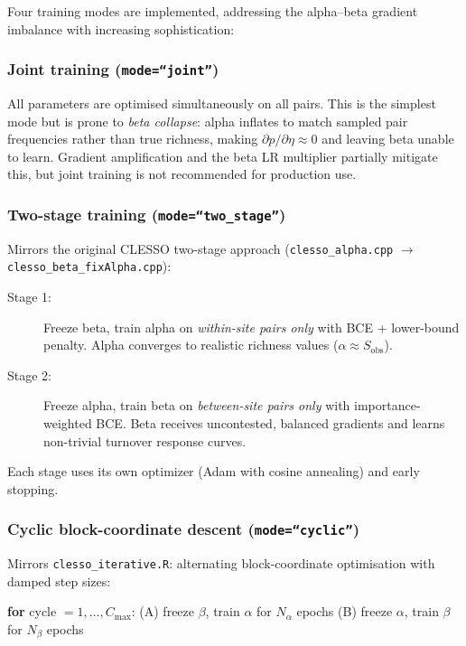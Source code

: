 \documentclass{article}
\begin{document}
Four training modes are implemented, addressing the alpha--beta gradient imbalance with increasing sophistication:

\subsubsection{Joint training (\texttt{mode=``joint''})}

All parameters are optimised simultaneously on all pairs. This is the simplest mode but is prone to \textit{beta collapse}: alpha inflates to match sampled pair frequencies rather than true richness, making $\partial p / \partial \eta \approx 0$ and leaving beta unable to learn. Gradient amplification and the beta LR multiplier partially mitigate this, but joint training is not recommended for production use.

\subsubsection{Two-stage training (\texttt{mode=``two\_stage''})}
\label{sec:two-stage}

Mirrors the original CLESSO two-stage approach (\texttt{clesso\_alpha.cpp} $\to$ \texttt{clesso\_beta\_fixAlpha.cpp}):

\begin{description}
    \item[Stage 1:] Freeze beta, train alpha on \textit{within-site pairs only} with BCE + lower-bound penalty. Alpha converges to realistic richness values ($\alpha \approx S_{\text{obs}}$).
    \item[Stage 2:] Freeze alpha, train beta on \textit{between-site pairs only} with importance-weighted BCE. Beta receives uncontested, balanced gradients and learns non-trivial turnover response curves.
\end{description}

Each stage uses its own optimizer (Adam with cosine annealing) and early stopping.

\subsubsection{Cyclic block-coordinate descent (\texttt{mode=``cyclic''})}
\label{sec:cyclic}

Mirrors \texttt{clesso\_iterative.R}: alternating block-coordinate optimisation with damped step sizes:

\begin{center}
\textbf{for} cycle $= 1, \ldots, C_{\max}$: \quad
(A) freeze $\beta$, train $\alpha$ for $N_\alpha$ epochs \quad
(B) freeze $\alpha$, train $\beta$ for $N_\beta$ epochs
\end{center}
\end{document}
